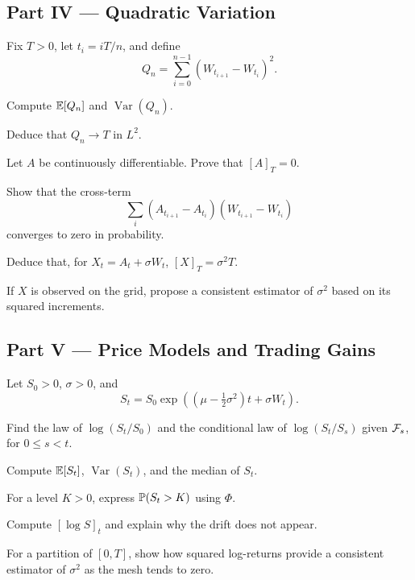 \subsection*{Part IV --- Quadratic Variation}

\begin{exercise}
Fix \(T>0\), let \(t_i=iT/n\), and define
\[
Q_n=\sum_{i=0}^{n-1}(W_{t_{i+1}}-W_{t_i})^2.
\]
\begin{exparts}
  \item Compute \(\mathbb{E}[Q_n]\) and \(\operatorname{Var}(Q_n)\).
  \item Deduce that \(Q_n\to T\) in \(L^2\).
  \item Let \(A\) be continuously differentiable. Prove that \([A]_T=0\).
  \item Show that the cross-term
  \[
  \sum_i(A_{t_{i+1}}-A_{t_i})(W_{t_{i+1}}-W_{t_i})
  \]
  converges to zero in probability.
  \item Deduce that, for \(X_t=A_t+\sigma W_t\),
  \([X]_T=\sigma^2T\).
  \item If \(X\) is observed on the grid, propose a consistent estimator of
  \(\sigma^2\) based on its squared increments.
\end{exparts}
\end{exercise}

\subsection*{Part V --- Price Models and Trading Gains}

\begin{exercise}
Let \(S_0>0\), \(\sigma>0\), and
\[
S_t=S_0\exp\!\left(
\left(\mu-\tfrac12\sigma^2\right)t+\sigma W_t
\right).
\]
\begin{exparts}
  \item Find the law of \(\log(S_t/S_0)\) and the conditional law of
  \(\log(S_t/S_s)\) given \(\mathcal{F}_s\), for \(0\leq s<t\).
  \item Compute \(\mathbb{E}[S_t]\), \(\operatorname{Var}(S_t)\), and the median of
  \(S_t\).
  \item For a level \(K>0\), express \(\mathbb{P}(S_t>K)\) using \(\Phi\).
  \item Compute \([\log S]_t\) and explain why the drift does not appear.
  \item For a partition of \([0,T]\), show how squared log-returns provide
  a consistent estimator of \(\sigma^2\) as the mesh tends to zero.
\end{exparts}
\end{exercise}

